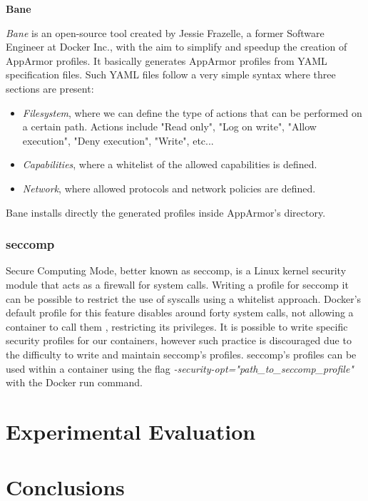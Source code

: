 \documentclass[a4paper,12pt]{article}
\begin{document}
\bigbreak\textbf{Bane}\bigbreak 

\textit{Bane}\cite{bane_jesse_frazelle} is an open-source tool created by Jessie Frazelle, a former
Software Engineer at Docker Inc., with the aim to simplify and speedup the creation of
AppArmor profiles. It basically generates AppArmor profiles from YAML
specification files. Such YAML files follow a very simple syntax where three
sections are present:
\begin{itemize}
  \item \textit{Filesystem}, where we can define the type of actions that can be
  performed on a certain path. Actions include "Read only", "Log on write",
  "Allow execution", "Deny execution", "Write", etc...
  \item \textit{Capabilities}, where a whitelist of the allowed capabilities is
  defined. 
  \item \textit{Network}, where allowed protocols and network policies are
  defined.
\end{itemize}
Bane installs directly the generated profiles inside AppArmor's directory.  

\subsubsection{seccomp}

Secure Computing Mode, better known as seccomp, is a Linux kernel security
module that acts as a firewall for system calls. Writing a profile for seccomp
it can be possible to restrict the use of syscalls using a whitelist approach.
Docker's default profile for this feature disables around forty system calls,
not allowing a container to call them , restricting its privileges. It is
possible to write specific security profiles for our containers, however such
practice is discouraged due to the difficulty to write and maintain seccomp's
profiles. seccomp's profiles can be used within a container using the flag
\textit{-security-opt="path\_to\_seccomp\_profile"} with the Docker run command.

\newpage

\section{Experimental Evaluation}

\newpage

\section{Conclusions}
\end{document}
